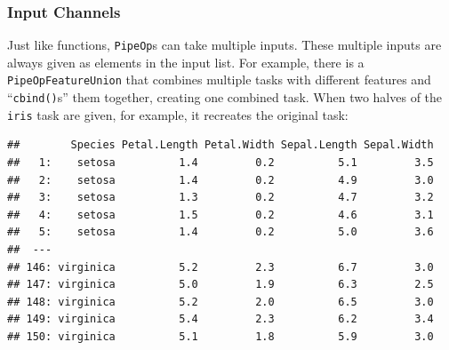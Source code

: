 \documentclass[
]{scrbook}
\newenvironment{Shaded}{\begin{snugshade}}{\end{snugshade}}
\newcommand{\AttributeTok}[1]{\textcolor[rgb]{0.77,0.63,0.00}{#1}}
\newcommand{\DecValTok}[1]{\textcolor[rgb]{0.00,0.00,0.81}{#1}}
\newcommand{\FunctionTok}[1]{\textcolor[rgb]{0.00,0.00,0.00}{#1}}
\newcommand{\NormalTok}[1]{#1}
\newcommand{\OtherTok}[1]{\textcolor[rgb]{0.56,0.35,0.01}{#1}}
\newcommand{\SpecialCharTok}[1]{\textcolor[rgb]{0.00,0.00,0.00}{#1}}
\newcommand{\StringTok}[1]{\textcolor[rgb]{0.31,0.60,0.02}{#1}}
\renewenvironment{Shaded} {\begin{snugshade}\small} {\end{snugshade}}
\begin{document}
\hypertarget{input-channels}{%
\subsubsection{Input Channels}\label{input-channels}}

Just like functions, \texttt{PipeOp}s can take multiple inputs.
These multiple inputs are always given as elements in the input list.
For example, there is a \texttt{PipeOpFeatureUnion} that combines multiple tasks with different features and ``\texttt{cbind()}s'' them together, creating one combined task.
When two halves of the \texttt{iris} task are given, for example, it recreates the original task:

\begin{Shaded}
\end{Shaded}

\begin{verbatim}
##        Species Petal.Length Petal.Width Sepal.Length Sepal.Width
##   1:    setosa          1.4         0.2          5.1         3.5
##   2:    setosa          1.4         0.2          4.9         3.0
##   3:    setosa          1.3         0.2          4.7         3.2
##   4:    setosa          1.5         0.2          4.6         3.1
##   5:    setosa          1.4         0.2          5.0         3.6
##  ---                                                            
## 146: virginica          5.2         2.3          6.7         3.0
## 147: virginica          5.0         1.9          6.3         2.5
## 148: virginica          5.2         2.0          6.5         3.0
## 149: virginica          5.4         2.3          6.2         3.4
## 150: virginica          5.1         1.8          5.9         3.0
\end{verbatim}
\end{document}
